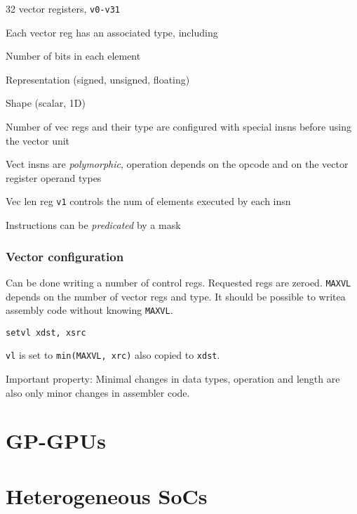 \documentclass[a4paper, fontsize=8pt, landscape, DIV=1]{scrartcl}
\makeatletter
\renewenvironment{outline}[1][]{%
  \ifthenelse{\equal{#1}{}}{}{\renewcommand{\ol@type}{#1}}%
  \ol@z%
  \newcommand{\0}{\ol@toz\ol@z}%
  \newcommand{\1}{\vspace{\dimexpr\outlinespacingscalar\baselineskip-\baselineskip}\ol@toi\ol@i\item}%
  \newcommand{\2}{\vspace{\dimexpr\outlinespacingscalartwo\baselineskip-\baselineskip}\ol@toii\ol@ii\item}%
  \newcommand{\3}{\vspace{\dimexpr\outlinespacingscalar\baselineskip-\baselineskip}\ol@toiii\ol@iii\item}%
  \newcommand{\4}{\vspace{\dimexpr\outlinespacingscalar\baselineskip-\baselineskip}\ol@toiiii\ol@iiii\item}%
}{%
  \ol@toz\ol@exit%
}
\def\outlinespacingscalar{0.5}
\def\outlinespacingscalartwo{0.5}
\makeatother
\begin{document}
\begin{multicols*}{4}
  \begin{outline}
    \1 32 vector registers, \texttt{v0-v31}
    \1 Each vector reg has an associated type, including
      \2 Number of bits in each element
      \2 Representation (signed, unsigned, floating)
      \2 Shape (scalar, 1D)
    \1 Number of vec regs and their type are configured with special insns before
    using the vector unit
    \1 Vect insns are \textit{polymorphic}, operation depends on the opcode and on the
    vector register operand types
    \1 Vec len reg \texttt{v1} controls the num of elements executed by each insn
    \1 Instructions can be \textit{predicated} by a mask
  \end{outline}

  \subsubsection{Vector configuration}
  Can be done writing a number of control regs. Requested regs are zeroed. \texttt{MAXVL}
  depends on the number of vector regs and type. It should be possible to writea assembly
  code without knowing \texttt{MAXVL}.
  
  \begin{lstlisting}[language={[x86masm]Assembler}]
setvl xdst, xsrc\end{lstlisting}
  \texttt{vl} is set to \texttt{min(MAXVL, xrc)} also copied to \texttt{xdst}.


  Important property: Minimal changes in data types, operation and length are also
  only minor changes in assembler code.

  \section{GP-GPUs}


  \section{Heterogeneous SoCs}




\end{multicols*}
\end{document}
